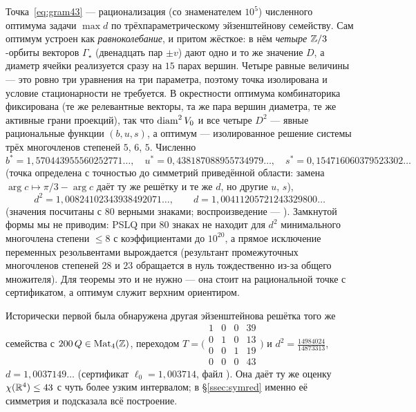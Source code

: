 \begin{remark}
Точка~\eqref{eq:gram43} --- рационализация (со знаменателем $10^5$) численного
оптимума задачи $\max d$ по трёхпараметрическому эйзенштейнову семейству. Сам
оптимум устроен как \emph{равноколебание}, и притом жёсткое: в нём
\emph{четыре} $\mathbb{Z}/3$-орбиты векторов $\Gamma_\star$ (двенадцать пар $\pm v$)
дают одно и то же значение $D$, а диаметр ячейки реализуется сразу на $15$
парах вершин. Четыре равные величины --- это ровно три уравнения на три
параметра, поэтому точка изолирована и условие стационарности не требуется.
В окрестности оптимума комбинаторика фиксирована (те же релевантные векторы,
та же пара вершин диаметра, те же активные грани проекций), так что
$\operatorname{diam}^2V_0$ и все четыре $D^2$ --- явные рациональные функции $(b,u,s)$, а
оптимум --- изолированное решение системы трёх многочленов степеней $5$, $6$,
$5$. Численно
\[
b^*=1{,}570443955560252771\ldots,\quad
u^*=0{,}438187088955734979\ldots,\quad
s^*=0{,}154716060379523302\ldots
\]
(точка определена с точностью до симметрий приведённой области: замена
$\arg c\mapsto\pi/3-\arg c$ даёт ту же решётку и те же $d$, но другие $u$, $s$),
\[
d^2=1{,}00824102343938492071\ldots,\qquad
d=1{,}00411205721243329800\ldots
\]
(значения посчитаны с $80$ верными знаками; воспроизведение ---
).
Замкнутой формы мы не приводим: PSLQ при $80$ знаках не находит для $d^2$
минимального многочлена степени $\le8$ с коэффициентами до $10^{20}$, а прямое
исключение переменных резольвентами вырождается (результант промежуточных
многочленов степеней $28$ и $23$ обращается в нуль тождественно из-за общего
множителя). Для теоремы это и не нужно --- она стоит на рациональной точке с
сертификатом, а оптимум служит верхним ориентиром.
\end{remark}

\begin{remark}
Исторически первой была обнаружена другая эйзенштейнова решётка того же
семейства с $200\,Q\in\mathrm{Mat}_4(\mathbb{Z})$, переходом
$T=\bigl(\begin{smallmatrix}1&0&0&39\\0&1&0&13\\0&0&1&19\\0&0&0&43\end{smallmatrix}\bigr)$
и $d^2=\tfrac{14984024}{14873313}$, $d=1{,}0037149\ldots$ (сертификат
$\ell_0=1{,}003714$, файл ). Она даёт ту же оценку
$\chi(\mathbb{R}^4)\le43$ с чуть более узким интервалом; в \S\ref{ssec:symred}
именно её симметрия и подсказала всё построение.
\end{remark}


